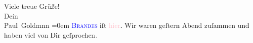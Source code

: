            \pstart
           Viele treue Grüße! {\\[\baselineskip]}Dein {\\[\baselineskip]}\spacefill\mbox{Paul Goldmnn}\pend
           \leftskip=0em{}\pstart
           \noindent{}\textsc{\textcolor{blue}{Brandes}{}\ledrightnote{\textcolor{blue}{Georg Brandes}}} iſt \textcolor{pink}{hier}{}\ledrightnote{{$\rightarrow$}\textcolor{pink}{Berlin}}. Wir waren
                     geſtern{ }Abend zuſammen und haben viel von Dir geſprochen.\pend
           \endnumbering{}\begin{anhang}\end{anhang}
      